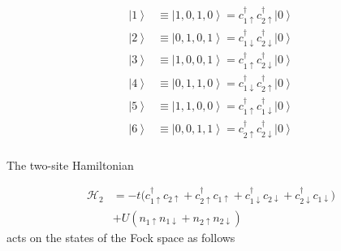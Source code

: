 \begin{equation}
\begin{split}
\left| 1 \right\rangle &\equiv \left| 1, 0, 1, 0 \right\rangle = c_{1\uparrow}^\dagger c_{2\uparrow}^\dagger \left| 0 \right\rangle \\
\left| 2 \right\rangle &\equiv \left| 0, 1, 0, 1 \right\rangle = c_{1\downarrow}^\dagger c_{2\downarrow}^\dagger \left| 0 \right\rangle \\
\left| 3 \right\rangle &\equiv \left| 1, 0, 0, 1 \right\rangle = c_{1\uparrow}^\dagger c_{2\downarrow}^\dagger \left| 0 \right\rangle \\
\left| 4 \right\rangle &\equiv \left| 0, 1, 1, 0 \right\rangle = c_{1\downarrow}^\dagger c_{2\uparrow}^\dagger \left| 0 \right\rangle \\
\left| 5 \right\rangle &\equiv \left| 1, 1, 0, 0 \right\rangle = c_{1\uparrow}^\dagger c_{1\downarrow}^\dagger \left| 0 \right\rangle \\
\left| 6 \right\rangle &\equiv \left| 0, 0, 1, 1 \right\rangle = c_{2\uparrow}^\dagger c_{2\downarrow}^\dagger \left| 0 \right\rangle \\
\end{split}
\end{equation}

The two-site Hamiltonian

\begin{equation}
\begin{split}
\mathcal{H}_{2} &= - t \bigg( c_{1\uparrow}^\dagger c_{2\uparrow} +  c_{2\uparrow}^\dagger c_{1\uparrow} + c_{1\downarrow}^\dagger c_{2\downarrow} +  c_{2\downarrow}^\dagger c_{1\downarrow} \bigg) \\
& + U (n_{1\uparrow}n_{1\downarrow} + n_{2\uparrow}n_{2\downarrow} )
\end{split}
\end{equation}
acts on the states of the Fock space as follows

